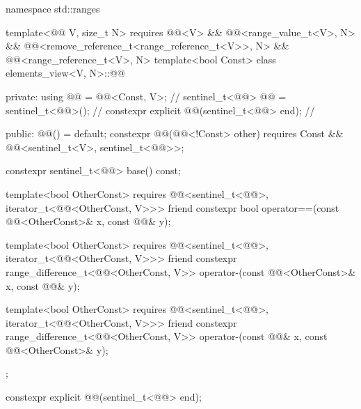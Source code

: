 %
\begin{codeblock}
namespace std::ranges {
  template<@@ V, size_t N>
    requires @@<V> && @@<range_value_t<V>, N> &&
             @@<remove_reference_t<range_reference_t<V>>, N> &&
             @@<range_reference_t<V>, N>
  template<bool Const>
  class elements_view<V, N>::@@ {
  private:
    using @@ = @@<Const, V>;                 // \expos
    sentinel_t<@@> @@ = sentinel_t<@@>();         // \expos
    constexpr explicit @@(sentinel_t<@@> end);  // \expos

  public:
    @@() = default;
    constexpr @@(@@<!Const> other)
      requires Const && @@<sentinel_t<V>, sentinel_t<@@>>;

    constexpr sentinel_t<@@> base() const;

    template<bool OtherConst>
      requires @@<sentinel_t<@@>, iterator_t<@@<OtherConst, V>>>
    friend constexpr bool operator==(const @@<OtherConst>& x, const @@& y);

    template<bool OtherConst>
      requires @@<sentinel_t<@@>, iterator_t<@@<OtherConst, V>>>
    friend constexpr range_difference_t<@@<OtherConst, V>>
      operator-(const @@<OtherConst>& x, const @@& y);

    template<bool OtherConst>
      requires @@<sentinel_t<@@>, iterator_t<@@<OtherConst, V>>>
    friend constexpr range_difference_t<@@<OtherConst, V>>
      operator-(const @@& x, const @@<OtherConst>& y);
  };
}
\end{codeblock}

%
\begin{itemdecl}
constexpr explicit @@(sentinel_t<@@> end);
\end{itemdecl}

